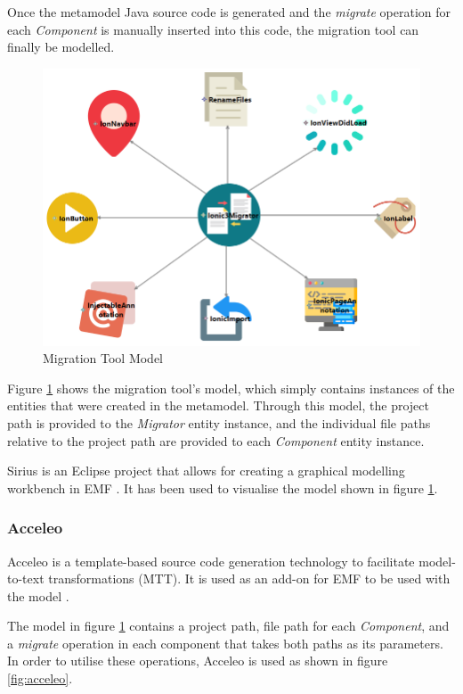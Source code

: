\documentclass[conference]{IEEEtran}
\begin{document}
Once the metamodel Java source code is generated and the \textit{migrate} operation for each \textit{Component} is manually inserted into this code, the migration tool can finally be modelled.

\begin{figure}[htbp]
\centerline{\includegraphics[width=\linewidth,height=\textheight,keepaspectratio]{model.png}}
\caption{Migration Tool Model}
\label{fig:model}
\end{figure}

Figure \ref{fig:model} shows the migration tool’s model, which simply contains instances of the entities that were created in the metamodel. Through this model, the project path is provided to the \textit{Migrator} entity instance, and the individual file paths relative to the project path are provided to each \textit{Component} entity instance.

Sirius is an Eclipse project that allows for creating a graphical modelling workbench in EMF \cite{b8}. It has been used to visualise the model shown in figure \ref{fig:model}.

\subsubsection{Acceleo}

Acceleo is a template-based source code generation technology to facilitate model-to-text transformations (MTT). It is used as an add-on for EMF to be used with the model \cite{b9}.

The model in figure \ref{fig:model} contains a project path, file path for each \textit{Component}, and a \textit{migrate} operation in each component that takes both paths as its parameters. In order to utilise these operations, Acceleo is used as shown in figure \ref{fig:acceleo}.
\end{document}
